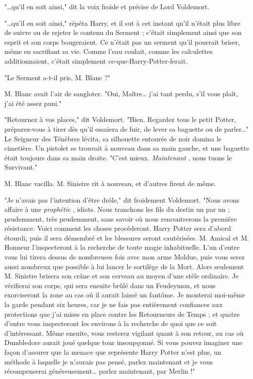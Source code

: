 "…qu'il en soit ainsi," dit la voix froide et précise de Lord Voldemort.

"…qu'il en soit ainsi," répéta Harry, et il sut à cet instant qu'il n'était plus libre de suivre ou de rejeter le contenu du Serment ; c'était simplement ainsi que son esprit et son corps bougeraient. Ce n'était pas un serment qu'il pourrait briser, même en sacrifiant sa vie. Comme l'eau coulait, comme les calculettes additionnaient, c'était simplement ce-que-Harry-Potter-ferait.

"Le Serment a-t-il pris, M. Blanc ?"

M. Blanc avait l'air de sangloter. "Oui, Maître… j'ai tant perdu, s'il vous plaît, j'ai été assez puni."

"Retournez à vos places," dit Voldemort. "Bien. Regardez tous le petit Potter, préparez-vous à tirer dès qu'il essaiera de fuir, de lever sa baguette ou de parler…" Le Seigneur des Ténèbres lévita, sa silhouette entourée de noir domina le cimetière. Un pistolet se trouvait à nouveau dans sa main gauche, et une baguette était toujours dans sa main droite. "C'est mieux. \emph{Maintenant} , nous tuons le Survivant."

M. Blanc vacilla. M. Sinistre rit à nouveau, et d'autres firent de même.

"Je n'avais pas l'intention d'être drôle," dit froidement Voldemort. "Nous avons affaire à une \emph{prophétie} , idiots. Nous tranchons les fils du destin un par un ; prudemment, très prudemment, sans savoir où nous rencontrerons la première résistance. Voici comment les choses procéderont. Harry Potter sera d'abord étourdi, puis il sera démembré et les blessures seront cautérisées. M. Amical et M. Honneur l'inspecteront à la recherche de toute magie inhabituelle. L'un d'entre vous lui tirera dessus de nombreuses fois avec mon arme Moldue, puis vous serez aussi nombreux que possible à lui lancer le sortilège de la Mort. Alors seulement M. Sinistre brisera son crâne et son cerveau au moyen d'une stèle ordinaire. Je vérifierai son corps, qui sera ensuite brûlé dans un Feudeymon, et nous exorciseront la zone au cas où il aurait laissé un fantôme. Je monterai moi-même la garde pendant six heures, car je ne fais pas entièrement confiances aux protections que j'ai mises en place contre les Retourneurs de Temps ; et quatre d'entre vous inspecteront les environs à la recherche de quoi que ce soit d'intéressant. Même ensuite, vous resterez vigilant quant à son retour, au cas où Dumbledore aurait joué quelque tour insoupçonné. Si vous pouvez imaginer une façon d'assurer que la menace que représente Harry Potter n'est plus, un méthode à laquelle je n'aurais pas pensé, parlez maintenant et je vous récompenserai généreusement… parlez maintenant, par Merlin !"

